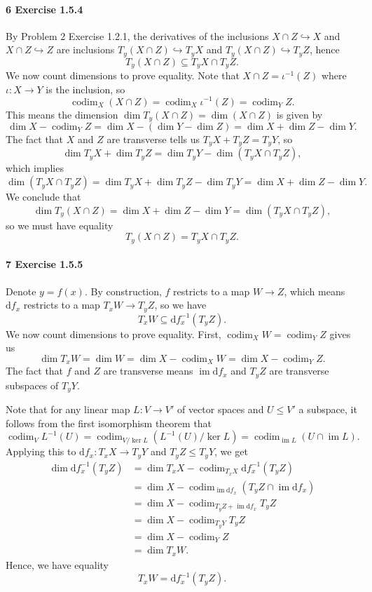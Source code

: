\documentclass[12pt]{article}
\newcommand{\pnum}[1]{\paragraph{#1}}
\theoremstyle{definition}
\newcommand{\<}{\langle}
\renewcommand{\>}{\rangle}
\newcommand{\seq}{\subseteq}
\DeclareMathOperator{\im}{im}
\newcommand{\inc}{\hookrightarrow}
\newcommand{\dd}{\mathrm{d}}
\DeclareMathOperator{\codim}{codim}
\begin{document}
\pnum{6 Exercise 1.5.4}

By Problem 2 Exercise 1.2.1, the derivatives of the inclusions $X \cap Z \inc X$ and $X \cap Z \inc Z$ are inclusions $T_y(X \cap Z) \inc T_yX$ and $T_y(X \cap Z) \inc T_yZ$, hence
\[
    T_y(X \cap Z) \seq T_yX \cap T_yZ.
\]
We now count dimensions to prove equality.
Note that $X \cap Z = \iota^{-1}(Z)$ where $\iota : X \to Y$ is the inclusion, so
\[
    \codim_X(X \cap Z)
        = \codim_X \iota^{-1}(Z)
        = \codim_Y Z.
\]
This means the dimension $\dim T_y(X \cap Z) = \dim (X \cap Z) $ is given by
\[
    \dim X - \codim_Y Z
        = \dim X - (\dim Y - \dim Z)
        = \dim X + \dim Z - \dim Y.
\]
The fact that $X$ and $Z$ are transverse tells us $T_yX + T_yZ = T_yY$, so
\[
    \dim T_yX + \dim T_yZ
        = \dim T_yY - \dim(T_yX \cap T_yZ),
\]
which implies
\[
    \dim(T_yX \cap T_yZ)
        = \dim T_yX + \dim T_yZ - \dim T_yY
        = \dim X + \dim Z - \dim Y.
\]
We conclude that
\[
    \dim T_y(X \cap Z)
        = \dim X + \dim Z - \dim Y
        = \dim(T_yX \cap T_yZ),
\]
so we must have equality
\[
    T_y(X \cap Z) = T_yX \cap T_yZ.
\]

\pnum{7 Exercise 1.5.5}

Denote $y = f(x)$.
By construction, $f$ restricts to a map $W \to Z$, which means $\dd{f}_x$ restricts to a map $T_xW \to T_yZ$, so we have
\[
    T_xW \seq \dd{f}_x^{-1}(T_yZ).
\]
We now count dimensions to prove equality.
First, $\codim_XW = \codim_YZ$ gives us
\[
    \dim T_xW
        = \dim W
        = \dim X - \codim_XW
        = \dim X - \codim_YZ.
\]
The fact that $f$ and $Z$ are transverse means $\im\dd{f}_x$ and $T_yZ$ are transverse subspaces of $T_yY$.

Note that for any linear map $L : V \to V'$ of vector spaces and $U \leq V'$ a subspace, it follows from the first isomorphism theorem that
\[
    \codim_VL^{-1}(U)
        = \codim_{V / \ker L} (L^{-1}(U) / \ker L)
        = \codim_{\im L} (U \cap \im L).
\]
Applying this to $\dd{f}_x : T_xX \to T_yY$ and $T_yZ \leq T_yY$, we get
\begin{align*}
    \dim\dd{f}_x^{-1}(T_yZ)
        &= \dim T_xX - \codim_{T_xX} \dd{f}_x^{-1}(T_yZ) \\
        &= \dim X - \codim_{\im\dd{f}_x}(T_yZ \cap \im\dd{f}_x) \\
        &= \dim X - \codim_{T_yZ + \im\dd{f}_x}T_yZ \\
        &= \dim X - \codim_{T_yY}T_yZ \\
        &= \dim X - \codim_YZ \\
        &= \dim T_xW.
\end{align*}
Hence, we have equality
\[
    T_xW = \dd{f}_x^{-1}(T_yZ).
\]
\end{document}
